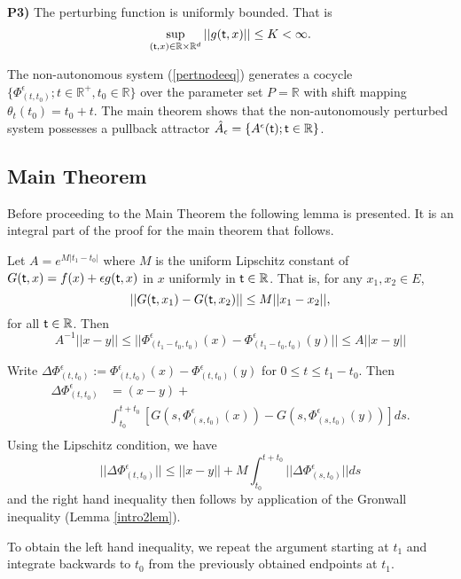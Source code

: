 \textbf{P3)} The perturbing function is uniformly bounded. That is
\begin{equation}\label{eqpertbd}
  \sup_{( \mathsf{\mathsf{t}},x) \in \mathbb{R} \times \mathbb{R}^d} ||g( \mathsf{\mathsf{t}},x)|| \leq
       K < \infty.
\end{equation}

The non-autonomous system (\ref{pertnodeeq}) generates a cocycle
$\{\Phi^{\epsilon}_{(t,t_0)} ; t \in \mathbb{R}^+, t_0 \in \mathbb{R} \}$ over
the parameter set $P = \mathbb{R}$ with shift mapping $\theta_t(t_0) = t_0 + t$.
The main theorem shows that the non-autonomously perturbed system possesses a
pullback attractor $\hat{A}_{\epsilon} = \{ A^{\epsilon}( \mathsf{\mathsf{t}}) ;  \mathsf{\mathsf{t}} \in \mathbb{R}
\}$.

\subsection{Main Theorem}

Before proceeding to the Main Theorem the following lemma is presented. It is an integral part of the proof for the main theorem that follows.


\begin{lemma} \label{lem1npertthm}Let $A = e^{M|t_1 - t_0|}$ where $M$
is the uniform Lipschitz constant of $G( \mathsf{\mathsf{t}},x) = f(x) + \epsilon g( \mathsf{\mathsf{t}},x)$ in $x$
uniformly in $ \mathsf{\mathsf{t}} \in \mathbb{R}$. That is, for any $x_1, x_2 \in E$, 
\[ ||G( \mathsf{\mathsf{t}}, x_1) - G( \mathsf{\mathsf{t}}, x_2)|| \leq M ||x_1-x_2||, \]
for all $ \mathsf{\mathsf{t}} \in \mathbb{R}$. Then
  \[ A^{-1}||x-y|| \leq ||\Phi^{\epsilon}_{(t_1 - t_0,t_0)}(x) -
        \Phi^{\epsilon}_{(t_1 - t_0,t_0)}(y)|| \leq A||x-y|| \]
\end{lemma}
\begin{prf}
  Write $\Delta \Phi^{\epsilon}_{(t,t_0)} := \Phi^{\epsilon}_{(t,t_0)}(x) -
  \Phi^{\epsilon}_{(t,t_0)}(y)$ for $0 \leq t \leq t_1 - t_0$. Then
  \begin{align*}
  \Delta \Phi^{\epsilon}_{(t,t_0)} &= (x-y) +  \\
        & \int^{t+t_0}_{t_0} [G(s, \Phi^{\epsilon}_{(s,t_0)}(x)) - G(s,
        \Phi^{\epsilon}_{(s,t_0)}(y))]ds. \\
  \end{align*}
  Using the Lipschitz condition, we have
  \[ ||\Delta \Phi^{\epsilon}_{(t,t_0)}|| \leq ||x-y|| + M
        \int^{t+t_0}_{t_0} ||\Delta \Phi^{\epsilon}_{(s,t_0)}||ds \]
and the right hand inequality then follows by application of the Gronwall
inequality (Lemma \ref{intro2lem}).

To obtain the left hand inequality, we repeat the argument
starting at $t_1$   and integrate backwards to $t_0$ from the previously
obtained endpoints at   $t_1$.
\end{prf}

